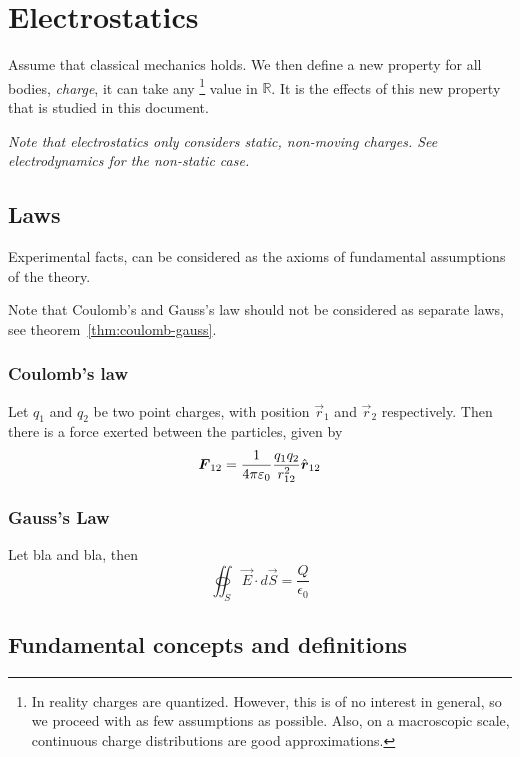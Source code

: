 \chapter{Electrostatics}

Assume that classical mechanics holds. We then define a new property
for all bodies, \emph{charge}, it can take any
\footnote{In reality charges are quantized. However, this is of no
  interest in general, so we proceed with as few assumptions as
  possible. Also, on a macroscopic scale, continuous charge
  distributions are good approximations.}
value in $\mathbb{R}$. It is the effects of this new property that is
studied in this document.

\emph{Note that electrostatics only considers static, non-moving
  charges. See electrodynamics for the non-static case.}




\section{Laws}

Experimental facts, can be considered as the axioms of fundamental
assumptions of the theory.

Note that Coulomb's and Gauss's law should not be considered as
separate laws, see theorem~\ref{thm:coulomb-gauss}.


\subsection{Coulomb's law}

Let $q_1$ and $q_2$ be two point charges, with position $\vec{r}_1$
and $\vec{r}_2$ respectively. Then there is a force exerted between
the particles, given by
\begin{equation*}
  \boldsymbol{F}_{12} = \frac{1}{4\pi\varepsilon_0}\frac{q_1q_2}{r_{12}^2}\hat{\boldsymbol{r}}_\text{12}
\end{equation*}


\subsection{Gauss's Law}

Let bla and bla, then
\begin{equation*}
  \oiint_S \vec{E} \cdot d\vec{S} = \frac{Q}{\epsilon_0}
\end{equation*}




\section{Fundamental concepts and definitions}

